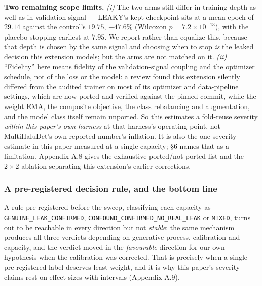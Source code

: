 \documentclass[10pt]{article} %
\begin{document}
\textbf{Two remaining scope limits.} \emph{(i)} The two arms still differ in
training depth as well as in validation signal --- LEAKY's kept checkpoint sits
at a mean epoch of $\mathbf{29.14}$ against the control's $\mathbf{19.75}$,
$+47.6\%$ (Wilcoxon $p=7.2\times10^{-13}$), with the placebo stopping earliest
at $7.95$. We report rather than equalize this, because that depth is chosen by
the same signal and choosing when to stop \emph{is} the leaked decision this
extension models; but the arms are not matched on it.
\emph{(ii)} ``Fidelity'' here means fidelity of the validation-signal coupling
and the optimizer schedule, not of the loss or the model: a review found this
extension silently differed from the audited trainer on most of its optimizer
and data-pipeline settings, which are now ported and verified against the
pinned commit, while the weight EMA, the composite objective, the class
rebalancing and augmentation, and the model class itself remain unported. So
this estimates a fold-reuse severity \emph{within this paper's own harness} at
that harness's operating point, not MultiHaluDet's own reported number's
inflation. It is also the one severity estimate in this paper measured at a
single capacity; §6 names that as a limitation. Appendix A.8 gives the
exhaustive ported/not-ported list and the $2\times2$ ablation separating this
extension's earlier corrections.

\subsubsection{A pre-registered decision rule, and the bottom line}

A rule pre-registered before the sweep, classifying each capacity as
\texttt{GENUINE\_LEAK\_CONFIRMED},
\texttt{CONFOUND\_CONFIRMED\_NO\_REAL\_LEAK} or \texttt{MIXED}, turns out to be
reachable in every direction but not \emph{stable}: the same mechanism produces
all three verdicts depending on generative process, calibration and capacity,
and the verdict moved in the \emph{favourable} direction for our own hypothesis
when the calibration was corrected. That is precisely when a single
pre-registered label deserves least weight, and it is why this paper's severity
claims rest on effect sizes with intervals (Appendix A.9).
\end{document}
